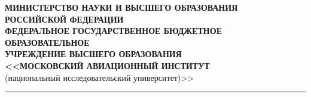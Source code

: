 \documentclass{article}
\begin{document}
\begin{center}
\begin{center}
\begin{minipage}{0.05\textwidth}%
    \resizebox{3cm}{!}{}
\end{minipage}
\hfill
\begin{minipage}{0.85\textwidth}\raggedleft
    \begin{center}
    \textbf{МИНИСТЕРСТВО НАУКИ И ВЫСШЕГО ОБРАЗОВАНИЯ\\ РОССИЙСКОЙ ФЕДЕРАЦИИ }\\
    \vspace{14pt}
    \textbf{ФЕДЕРАЛЬНОЕ ГОСУДАРСТВЕННОЕ БЮДЖЕТНОЕ ОБРАЗОВАТЕЛЬНОЕ\\
        УЧРЕЖДЕНИЕ ВЫСШЕГО ОБРАЗОВАНИЯ\\
    <<МОСКОВСКИЙ АВИАЦИОННЫЙ ИНСТИТУТ}\\ 
    (национальный исследовательский университет)>>
\end{center}
\end{minipage}
\end{center}
\vspace{14pt}
\rule{\textwidth}{2pt}\\

\vspace{14pt}

\begin{minipage}{\textwidth}




\end{minipage}


\end{center}
\end{document}
